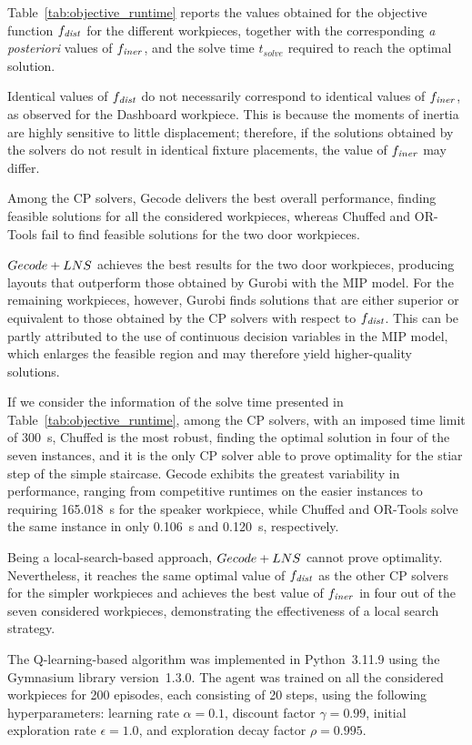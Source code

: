 Table~\ref{tab:objective_runtime} reports the values obtained for the objective function $f_\mathit{dist}$ for the different workpieces, together with the corresponding \emph{a posteriori} values of $f_\mathit{iner}$, and the solve time $t_{solve}$ required to reach the optimal solution. 

Identical values of $f_\mathit{dist}$ do not necessarily correspond to identical values of $f_\mathit{iner}$, as observed for the Dashboard workpiece. This is because the moments of inertia are highly sensitive to little displacement; therefore, if the solutions obtained by the solvers do not result in identical fixture placements, the value of $f_\mathit{iner}$ may differ. 

Among the CP solvers, Gecode delivers the best overall performance, finding feasible solutions for all the considered workpieces, whereas Chuffed and OR-Tools fail to find feasible solutions for the two door workpieces.

$Gecode+LNS$ achieves the best results for the two door workpieces, producing layouts that outperform those obtained by Gurobi with the MIP model. For the remaining workpieces, however, Gurobi finds solutions that are either superior or equivalent to those obtained by the CP solvers with respect to $f_\mathit{dist}$. This can be partly attributed to the use of continuous decision variables in the MIP model, which enlarges the feasible region and may therefore yield higher-quality solutions.

If we consider the information of the solve time presented in Table~\ref{tab:objective_runtime}, among the CP solvers, with an imposed time limit of 300~s, Chuffed is the most robust, finding the optimal solution in four of the seven instances, and it is the only CP solver able to prove optimality for the stiar step of the simple staircase. Gecode exhibits the greatest variability in performance, ranging from competitive runtimes on the easier instances to requiring 165.018~s for the speaker workpiece, while Chuffed and OR-Tools solve the same instance in only 0.106~s and 0.120~s, respectively.

Being a local-search-based approach, $Gecode+LNS$ cannot prove optimality. Nevertheless, it reaches the same optimal value of $f_\mathit{dist}$ as the other CP solvers for the simpler workpieces and achieves the best value of $f_\mathit{iner}$ in four out of the seven considered workpieces, demonstrating the effectiveness of a local search strategy.

The Q-learning-based algorithm was implemented in Python~3.11.9 using the Gymnasium library version~1.3.0. The agent was trained on all the considered workpieces for 200 episodes, each consisting of 20 steps, using the following hyperparameters: learning rate $\alpha = 0.1$, discount factor $\gamma = 0.99$, initial exploration rate $\epsilon = 1.0$, and exploration decay factor $\rho = 0.995$.

